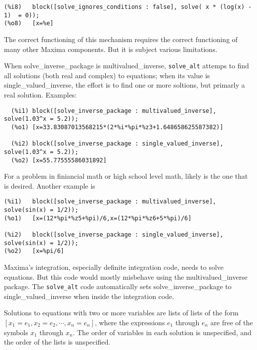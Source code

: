 \documentclass[]{scrartcl}
\newcommand{\altsolve}{\texttt{solve\_alt}}
\begin{document}
\begin{description}
\begin{verbatim}
(%i8)	block([solve_ignores_conditions : false], solve( x * (log(x) - 1)  = 0));
(%o8)	[x=%e]
\end{verbatim}

The correct functioning of this mechanism requires the correct functioning of many other Maxima components. But it is subject various limitations.

\item[solve\_inverse\_package] When solve\_inverse\_package is multivalued\_inverse, \altsolve\/ attemps to find all solutions (both real and complex) to equations; when its value is single\_valued\_inverse, the effort is to find one or more soltions, but primarly a real solution. Examples:
\begin{verbatim}
  (%i1)	block([solve_inverse_package : multivalued_inverse], solve(1.03^x = 5.2));
  (%o1)	[x=33.83087013568215*(2*%i*%pi*%z3+1.648658625587382)]

  (%i2)	block([solve_inverse_package : single_valued_inverse], solve(1.03^x = 5.2));
  (%o2)	[x=55.77555586031892]
\end{verbatim}
For a problem in finiancial math or high school level math, likely is the one that is desired. Another
example is
\begin{verbatim}
(%i1)	block([solve_inverse_package : multivalued_inverse], solve(sin(x) = 1/2));
(%o1)	[x=(12*%pi*%z5+%pi)/6,x=(12*%pi*%z6+5*%pi)/6]

(%i2)	block([solve_inverse_package : single_valued_inverse], solve(sin(x) = 1/2));
(%o2)	[x=%pi/6]
\end{verbatim}

Maxima's integration, especially definite integration code, needs to solve equations. But this code would mostly misbehave using the  multivalued\_inverse package. The \altsolve\/ code automatically sets solve\_inverse\_package to single\_valued\_inverse when inside the integration code.

\end{description}








Solutions to equations with two or more variables are lists of lists of the form \([x_1 = e_1, x_2 = e_2,
\cdots, x_n = e_n] \), where the expressions \(e_1\) through \(e_n\) are free of the symbols \(x_1\)
through \(x_n \). The order of variables in each solution is unspecified, and the order of the lists is
unspecified.
\end{document}
